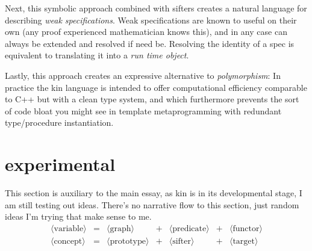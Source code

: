 \documentclass[twoside]{article}
\begin{document}
Next, this symbolic approach combined with sifters creates a natural language for describing \emph{weak specifications}.
Weak specifications are known to useful on their own (any proof experienced mathematician knows this), and in any case can
always be extended and resolved if need be. Resolving the identity of a spec is equivalent to translating it into
a \emph{run time object}.

Lastly, this approach creates an expressive alternative to \emph{polymorphism}: In practice the kin language is intended
to offer computational efficiency comparable to C++ but with a clean type system, and which furthermore prevents the sort
of code bloat you might see in template metaprogramming with redundant type/procedure instantiation.

\section*{experimental}

This section is auxiliary to the main essay, as kin is in its developmental stage, I am still testing out ideas.
There's no narrative flow to this section, just random ideas I'm trying that make sense to me.\\[0.1cm]

$$ \begin{array}{rclclcl}
\langle\mbox{variable}\rangle & = & \langle\mbox{graph}\rangle & + &\langle\mbox{predicate}\rangle & + &\langle\mbox{functor}\rangle \\
\langle\mbox{concept}\rangle & = & \langle\mbox{prototype}\rangle & + &\langle\mbox{sifter}\rangle & + &\langle\mbox{target}\rangle \\
\end{array} $$\\[0.1cm]
\end{document}
